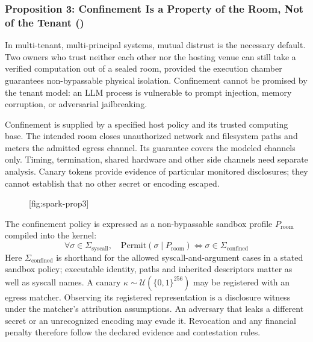 \subsubsection*{Proposition 3: Confinement Is a Property of the Room, Not of the Tenant ()}
In multi-tenant, multi-principal systems, mutual distrust is the necessary default. Two owners who trust neither each other nor the hosting venue can still take a verified computation out of a sealed room, provided the execution chamber guarantees non-bypassable physical isolation. Confinement cannot be promised by the tenant model: an LLM process is vulnerable to prompt injection, memory corruption, or adversarial jailbreaking.

Confinement is supplied by a specified host policy and its trusted computing base. The intended room closes unauthorized network and filesystem paths and meters the admitted egress channel. Its guarantee covers the modeled channels only. Timing, termination, shared hardware and other side channels need separate analysis. Canary tokens provide evidence of particular monitored disclosures; they cannot establish that no other secret or encoding escaped.

\begin{figure}[tp]
  \centering
  [fig:spark-prop3]
\end{figure}

The confinement policy is expressed as a non-bypassable sandbox profile $P_{\text{room}}$ compiled into the kernel:
\begin{equation}
\forall \sigma \in \Sigma_{\text{syscall}}, \quad \mathrm{Permit}(\sigma \mid P_{\text{room}}) \iff \sigma \in \Sigma_{\text{confined}}
\end{equation}
Here $\Sigma_{\text{confined}}$ is shorthand for the allowed syscall-and-argument cases in a stated sandbox policy; executable identity, paths and inherited descriptors matter as well as syscall names. A canary $\kappa\sim\mathcal{U}(\{0,1\}^{256})$ may be registered with an egress matcher. Observing its registered representation is a disclosure witness under the matcher's attribution assumptions. An adversary that leaks a different secret or an unrecognized encoding may evade it. Revocation and any financial penalty therefore follow the declared evidence and contestation rules.

